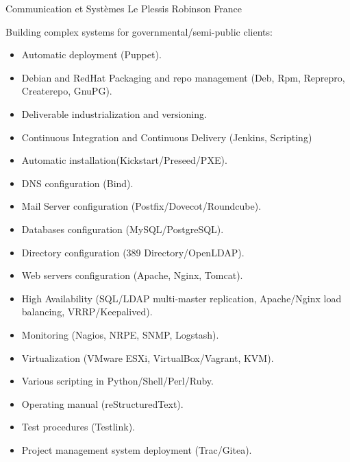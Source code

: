 \documentclass[10pt,a4paper,sans]{moderncv}        %
\begin{document}
        {Communication et Systèmes}
        {Le Plessis Robinson}
        {France}
        {Building complex systems for governmental/semi-public clients:
        \begin{itemize}
        \item Automatic deployment (Puppet).
        \item Debian and RedHat Packaging and repo management (Deb, Rpm, Reprepro, Createrepo, GnuPG).
        \item Deliverable industrialization and versioning.
        \item Continuous Integration and Continuous Delivery (Jenkins, Scripting)
        \item Automatic installation(Kickstart/Preseed/PXE).
        \item DNS configuration (Bind).
        \item Mail Server configuration (Postfix/Dovecot/Roundcube).
        \item Databases configuration (MySQL/PostgreSQL).
        \item Directory configuration (389 Directory/OpenLDAP).
        \item Web servers configuration (Apache, Nginx, Tomcat).
        \item High Availability (SQL/LDAP multi-master replication, Apache/Nginx load balancing, VRRP/Keepalived).
        \item Monitoring (Nagios, NRPE, SNMP, Logstash).
        \item Virtualization (VMware ESXi, VirtualBox/Vagrant, KVM).
        \item Various scripting in Python/Shell/Perl/Ruby.
        \item Operating manual (reStructuredText).
        \item Test procedures (Testlink).
        \item Project management system deployment (Trac/Gitea).
        \end{itemize}
        }
\end{document}
